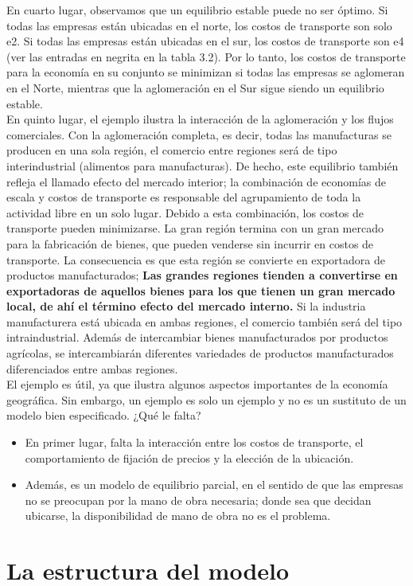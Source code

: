 En cuarto lugar, observamos que un equilibrio estable puede no ser óptimo. Si todas las empresas están ubicadas en el norte, los costos de transporte son solo e2. Si todas las empresas están ubicadas en el sur, los costos de transporte son e4 (ver las entradas en negrita en la tabla 3.2). Por lo tanto, los costos de transporte para la economía en su conjunto se minimizan si todas las empresas se aglomeran en el Norte, mientras que la aglomeración en el Sur sigue siendo un equilibrio estable.\\
En quinto lugar, el ejemplo ilustra la interacción de la aglomeración y los flujos comerciales. Con la aglomeración completa, es decir, todas las manufacturas se producen en una sola región, el comercio entre regiones será de tipo interindustrial (alimentos para manufacturas). De hecho, este equilibrio también refleja el llamado efecto del mercado interior; la combinación de economías de escala y costos de transporte es responsable del agrupamiento de toda la actividad libre en un solo lugar. Debido a esta combinación, los costos de transporte pueden minimizarse. La gran región termina con un gran mercado para la fabricación de bienes, que pueden venderse sin incurrir en costos de transporte. La consecuencia es que esta región se convierte en exportadora de productos manufacturados; \textbf{Las grandes regiones tienden a convertirse en exportadoras de aquellos bienes para los que tienen un gran mercado local, de ahí el término efecto del mercado interno.} Si la industria manufacturera está ubicada en ambas regiones, el comercio también será del tipo intraindustrial. Además de intercambiar bienes manufacturados por productos agrícolas, se intercambiarán diferentes variedades de productos manufacturados diferenciados entre ambas regiones.\\
El ejemplo es útil, ya que ilustra algunos aspectos importantes de la economía geográfica. Sin embargo, un ejemplo es solo un ejemplo y no es un sustituto de un modelo bien especificado. ¿Qué le falta?
\begin{itemize}
    \item En primer lugar, falta la interacción entre los costos de transporte, el comportamiento de fijación de precios y la elección de la ubicación. 
    \item Además, es un modelo de equilibrio parcial, en el sentido de que las empresas no se preocupan por la mano de obra necesaria; donde sea que decidan ubicarse, la disponibilidad de mano de obra no es el problema. 
\end{itemize}

\section{La estructura del modelo}


